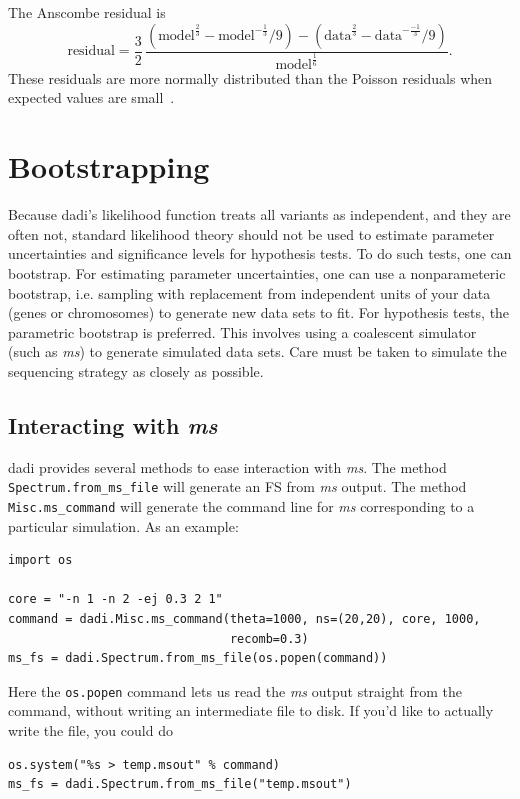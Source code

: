 \documentclass[12pt]{article}
\makeatletter
\newcommand{\dadi}{dadi\xspace}
\newcommand{\ms}{\emph{ms}\xspace}
\newcommand{\py}[1]{\lstinline[language=Python, showstringspaces=False]@#1@}
\makeatother
\begin{document}
The Anscombe residual is
\begin{equation}
\text{residual} = \frac{3}{2} \, \frac{(\text{model}^\frac{2}{3} - \text{model}^{-\frac{1}{3}}/9) - (\text{data}^\frac{2}{3} - \text{data}^{-\frac{-1}{3}}/9)}{\text{model}^\frac{1}{6}}.
\end{equation}
These residuals are more normally distributed than the Poisson residuals when expected values are small~\cite{bib:Pierce1986}.

\section{Bootstrapping}

Because \dadi's likelihood function treats all variants as independent, and they are often not, standard likelihood theory should not be used to estimate parameter uncertainties and significance levels for hypothesis tests.
To do such tests, one can bootstrap.
For estimating parameter uncertainties, one can use a nonparameteric bootstrap, i.e. sampling with replacement from independent units of your data (genes or chromosomes) to generate new data sets to fit.
For hypothesis tests, the parametric bootstrap is preferred.
This involves using a coalescent simulator (such as \ms) to generate simulated data sets.
Care must be taken to simulate the sequencing strategy as closely as possible.

\subsection{Interacting with \ms}

\dadi provides several methods to ease interaction with \ms.
The method \py{Spectrum.from_ms_file} will generate an FS from \ms output.
The method \py{Misc.ms_command} will generate the command line for \ms corresponding to a particular simulation.
As an example:
\begin{lstlisting}
import os

core = "-n 1 -n 2 -ej 0.3 2 1"
command = dadi.Misc.ms_command(theta=1000, ns=(20,20), core, 1000,
                               recomb=0.3)
ms_fs = dadi.Spectrum.from_ms_file(os.popen(command))
\end{lstlisting}
Here the \py{os.popen} command lets us read the \ms output straight from the command, without writing an intermediate file to disk.
If you'd like to actually write the file, you could do
\begin{lstlisting}
os.system("%s > temp.msout" % command)
ms_fs = dadi.Spectrum.from_ms_file("temp.msout")
\end{lstlisting}
\end{document}
